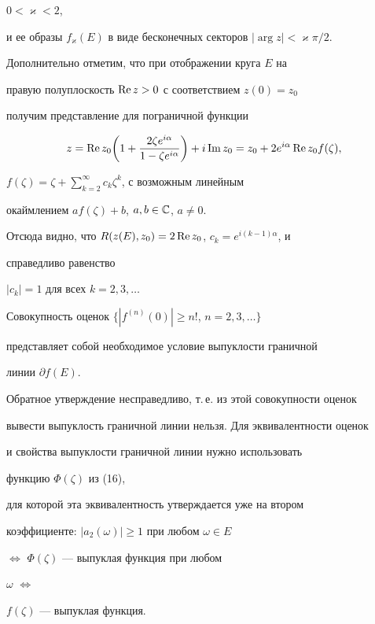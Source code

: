 \begin{note}
$0<\varkappa<2$, 


и ее образы $f_\varkappa(E)$ в виде бесконечных секторов $|\arg 


z|<\varkappa\pi/2$. 


 


Дополнительно отметим, что при отображении круга $E$ на 


правую полуплоскость $\operatorname{Re} z>0$ с соответствием $z(0)=z_0$ 


получим представление для пограничной функции 


$$ 


z=\re z_0\bigg(1+\frac{2\zeta e^{i\alpha}}{1-\zeta e^{i\alpha}} 


\bigg)+i\im z_0=z_0+2e^{i\alpha}\re z_0f(\zeta), 


$$ 


$f(\zeta)=\zeta+\sum\limits^\infty_{k=2}c_k\zeta^k$, с возможным линейным 


окаймлением $af(\zeta)+b$, $a,b\in\Bbb C$, $a\ne0$. 


Отсюда видно, что $R(z(E),z_0)=2\operatorname{Re} z_0$, $c_k=e^{i(k-1)\alpha}$, и 


справедливо равенство 


$|c_k|=1$ для всех $k=2,3,\dotsc$ 


\end{note} 


 


\begin{note} 


Совокупность оценок $\{|f^{(n)}(0)|\ge n!$, $n=2,3,\dotsc\}$ 


представляет собой необходимое условие выпуклости граничной 


линии $\partial f(E)$. 


Обратное утверждение несправедливо, т.\,е. из этой совокупности оценок 


вывести выпуклость граничной линии нельзя. Для эквивалентности оценок 


и свойства выпуклости граничной линии нужно использовать 


функцию $\Phi(\zeta)$ из (16), 


для которой эта эквивалентность утверждается уже на втором 


коэффициенте: $|a_2(\omega)|\ge1$ при любом $\omega\in E$ 


$\Longleftrightarrow$ $\Phi(\zeta)$ --- выпуклая функция при любом 


$\omega$ $\Longleftrightarrow$ 


$f(\zeta)$ --- выпуклая функция. 


\end{note} 


